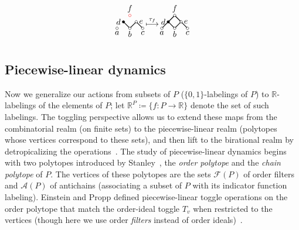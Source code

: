 \documentclass[ALCO,ThmDefs,Unicode,epreuves]{cedram}
\newcommand{\rr}{\mathbb{R}}
\newcommand{\cala}{\mathcal{A}}
\newcommand{\calf}{\mathcal{F}}
\begin{document}
\begin{exam}
\[\begin{tikzpicture}[scale=0.274]
\begin{scope}[shift={(35,-4)}]
\draw[thick] (-0.9, 0.9) -- (-0.1, 0.1);
\draw[thick] (0.9, 0.9) -- (0.1, 0.1);
\draw[thick] (1.1, 0.9) -- (1.9, 0.1);
\draw[red] (0,2) circle [radius=0.2];
\draw[fill] (-1,1) circle [radius=0.2];
\draw (1,1) circle [radius=0.2];
\draw (-2,0) circle [radius=0.2];
\draw (0,0) circle [radius=0.2];
\draw (2,0) circle [radius=0.2];
\node[above] at (0,2) {$f$};
\node[left] at (-1,1) {$d$};
\node[right] at (1,1) {$e$};
\node[below] at (-2,0) {$a$};
\node[below] at (0,0) {$b$};
\node[below] at (2,0) {$c$};
\end{scope}
\node at (38.5,-3) {$\stackrel{\tau_f}{\longmapsto}$};
\begin{scope}[shift={(42,-4)}]
\draw[thick] (-0.1, 1.9) -- (-0.9, 1.1);
\draw[thick] (0.1, 1.9) -- (0.9, 1.1);
\draw[thick] (-1.1, 0.9) -- (-1.9, 0.1);
\draw[thick] (-0.9, 0.9) -- (-0.1, 0.1);
\draw[thick] (0.9, 0.9) -- (0.1, 0.1);
\draw[thick] (1.1, 0.9) -- (1.9, 0.1);
\draw (0,2) circle [radius=0.2];
\draw[fill] (-1,1) circle [radius=0.2];
\draw (1,1) circle [radius=0.2];
\draw (-2,0) circle [radius=0.2];
\draw (0,0) circle [radius=0.2];
\draw (2,0) circle [radius=0.2];
\node[above] at (0,2) {$f$};
\node[left] at (-1,1) {$d$};
\node[right] at (1,1) {$e$};
\node[below] at (-2,0) {$a$};
\node[below] at (0,0) {$b$};
\node[below] at (2,0) {$c$};
\end{scope}
\end{tikzpicture}
\]
\end{exam}

\subsection{Piecewise-linear dynamics}
Now we generalize our actions from subsets of $P$ (\ie $\{0,1 \}$-labelings of $P$)
to $\rr$-labelings of the elements of $P$; let $\rr^P\coloneqq \{f:P\rightarrow \rr \}$ denote the set of such labelings.
The toggling perspective allows us to extend these maps from the combinatorial realm
(on finite sets) to the piecewise-linear realm (polytopes whose vertices correspond to these
sets), and then lift to the birational realm by detropicalizing the operations~\cite{einpropp}.
The study of piecewise-linear dynamics begins with two polytopes introduced by Stanley~\cite{Sta86}, the \textit{order polytope} and the \textit{chain polytope} of $P$.
The vertices of these polytopes are the sets $\calf(P)$ of order filters and $\cala(P)$ of antichains (associating a subset of $P$ with its indicator function
labeling). Einstein and Propp defined piecewise-linear toggle operations on the order
polytope that match the order-ideal toggle $T_v$ when restricted to the vertices (though here
we use order \emph{filters} instead of order ideals)~\cite[\S~3,4]{einpropp}.
\end{document}
